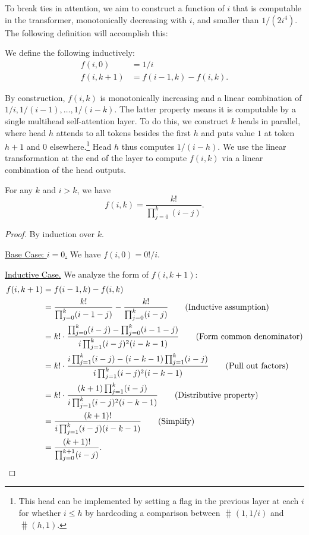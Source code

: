 To break ties in attention, we aim to construct a function of $i$ that is computable in the transformer, monotonically decreasing with $i$, and smaller than $1/(2i^4)$. The following definition will accomplish this:

\begin{definition} %
    We define the following inductively:
    \begin{align*}
            f(i, 0) & = 1/i \\
            f(i, k+1) & = f(i-1, k) - f(i, k) .
    \end{align*}
\end{definition}

By construction, $f(i, k)$ is monotonically increasing and a linear combination of $1/i, 1/(i-1), \ldots, 1/(i-k)$. The latter property means it is computable by a single multihead self-attention layer. To do this, we construct $k$ heads in parallel, where head $h$ attends to all tokens besides the first $h$ and puts value $1$ at token $h + 1$ and $0$ elsewhere.\footnote{This head can be implemented by setting a flag in the previous layer at each $i$ for whether $i \leq h$ by hardcoding a comparison between $\hash(1, 1/i)$ and $\hash(h, 1)$.} Head $h$ thus computes $1/(i-h)$. We use the linear transformation at the end of the layer to compute $f(i, k)$ via a linear combination of the head outputs.

\begin{lemma}
    \label{lem:tie-breaker-form}
    For any $k$ and $i > k$, we have
    \begin{equation*}
        f(i, k) = \frac{k!}{\prod_{j=0}^k (i - j)} .
    \end{equation*}
\end{lemma}

\begin{proof}
    By induction over $k$.

    \underline{Base Case: $i = 0$.} We have $f(i, 0) = 0! / i$.

    \underline{Inductive Case.} We analyze the form of $f(i, k + 1)$:
    \begin{align*}
        f(i, k + 1)
        &= f(i - 1, k) - f(i, k) \\
        &= \frac{k!}{\prod_{j=0}^k (i-1-j)} - \frac{k!}{\prod_{j=0}^k (i-j)} \tag{Inductive assumption}\\
        &= k! \cdot \frac{\prod_{j=0}^k (i-j) - \prod_{j=0}^k (i-1-j)}{i \prod_{j=1}^k (i-j)^2 (i-k-1)} \tag{Form common denominator}\\
        &= k! \cdot \frac{i \prod_{j=1}^k (i-j) - (i - k - 1) \prod_{j=1}^k (i-j)}{i \prod_{j=1}^k (i-j)^2 (i-k-1)} \tag{Pull out factors}\\
        &= k! \cdot \frac{(k + 1) \prod_{j=1}^k (i-j)}{i \prod_{j=1}^k (i-j)^2 (i-k-1)} \tag{Distributive property}\\
        &= \frac{(k + 1)!}{i \prod_{j=1}^k (i-j) (i-k-1)} \tag{Simplify}\\
        &= \frac{(k + 1)!}{\prod_{j=0}^{k + 1} (i-j)} . \qedhere
    \end{align*}
\end{proof}

